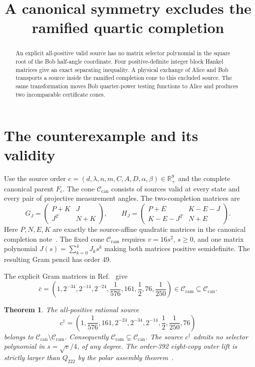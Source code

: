 \documentclass[10pt]{article}
\title{A canonical symmetry excludes the ramified quartic completion}
\author{}\date{}
\newtheorem{theorem}{Theorem}
\newcommand{\R}{\mathbb R}
\newcommand{\Cr}{\mathcal C_{\mathrm{ram}}}
\newcommand{\Cc}{\mathcal C_{\mathrm{can}}}
\begin{document}
\maketitle\vspace{-2.5em}
\begin{abstract}
An explicit all-positive valid source has no matrix selector polynomial
in the square root of the Bob half-angle coordinate. Four positive-definite integer block
Hankel matrices give an exact separating inequality. A physical exchange
of Alice and Bob transports a source inside the ramified completion cone
to this excluded source. The same transformation moves Bob quarter-power
testing functions to Alice and produces two incomparable certificate cones.
\end{abstract}

\section{The counterexample and its validity}

Use the source order
$c=(d,\lambda,n,m,C,A,D,\alpha,\beta)\in\R_+^9$ and the complete
canonical parent $F_c$. The cone $\Cc$ consists of sources valid at every
state and every pair of projective measurement angles. The
two-completion matrices are
\[
 G_J=\begin{pmatrix}P+K&J\\J^T&N+K\end{pmatrix},\qquad
 H_J=\begin{pmatrix}P+E&K-E-J\\K-E-J^T&N+E\end{pmatrix}.
\]
Here $P,N,E,K$ are exactly the source-affine quadratic matrices in the
canonical completion note~\cite{accepted}. The fixed cone $\Cr$ requires
$v=16s^2$, $s\ge0$, and one matrix polynomial
$J(s)=\sum_{k=0}^4J_ks^k$ making both matrices positive semidefinite.
The resulting Gram pencil has order 49.

The explicit Gram matrices in Ref.~\cite{accepted} give
\[
 \bar c=\left(1,2^{-34},2^{-14},2^{-24},\frac1{576},161,
                   \frac12,76,\frac1{250}\right)\in\Cr\subseteq\Cc.
 \tag{1}
\]

\begin{theorem}\label{thm:main}
The all-positive rational source
\[
 \boxed{c^\dagger=\left(1,\frac1{576},161,2^{-24},2^{-34},2^{-14},
                   \frac12,\frac1{250},76\right)}           \tag{2}
\]
belongs to $\Cc\setminus\Cr$. Consequently
$\Cr\subsetneq\Cc$. The source $c^\dagger$ admits no selector polynomial
in $s=\sqrt v/4$, of any degree. The order-392 eight-copy outer lift is
strictly larger than $Q_{222}$ by the polar assembly theorem~\cite{assembly}.
\end{theorem}
\end{document}
